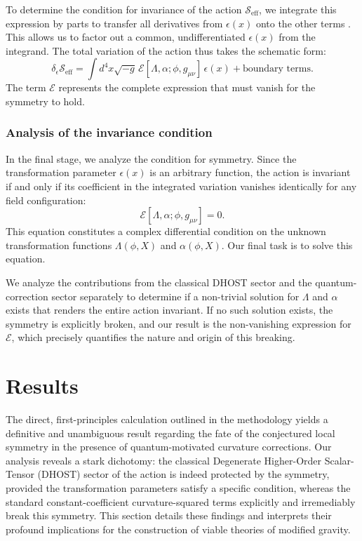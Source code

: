 \documentclass[twocolumn]{aastex631}
\begin{document}
To determine the condition for invariance of the action $\mathcal{S}_{\text{eff}}$, we integrate this expression by parts to transfer all derivatives from $\epsilon(x)$ onto the other terms \citep{gieres2022improvementconservedcurrentdensity,peng2025extractingexpressionfieldequations}. This allows us to factor out a common, undifferentiated $\epsilon(x)$ from the integrand. The total variation of the action thus takes the schematic form:
\begin{equation}
\delta_\epsilon \mathcal{S}_{\text{eff}} = \int d^4x \sqrt{-g} \, \mathcal{E}[\Lambda, \alpha; \phi, g_{\mu\nu}] \, \epsilon(x) + \text{boundary terms}.
\end{equation}
The term $\mathcal{E}$ represents the complete expression that must vanish for the symmetry to hold.
\subsubsection{Analysis of the invariance condition}
In the final stage, we analyze the condition for symmetry. Since the transformation parameter $\epsilon(x)$ is an arbitrary function, the action is invariant if and only if its coefficient in the integrated variation vanishes identically for any field configuration:
\begin{equation}
\mathcal{E}[\Lambda, \alpha; \phi, g_{\mu\nu}] = 0.
\end{equation}
This equation constitutes a complex differential condition on the unknown transformation functions $\Lambda(\phi, X)$ and $\alpha(\phi, X)$. Our final task is to solve this equation.

We analyze the contributions from the classical DHOST sector and the quantum-correction sector separately to determine if a non-trivial solution for $\Lambda$ and $\alpha$ exists that renders the entire action invariant. If no such solution exists, the symmetry is explicitly broken, and our result is the non-vanishing expression for $\mathcal{E}$, which precisely quantifies the nature and origin of this breaking.

\section{Results}
\label{sec:results}
The direct, first-principles calculation outlined in the methodology yields a definitive and unambiguous result regarding the fate of the conjectured local symmetry in the presence of quantum-motivated curvature corrections. Our analysis reveals a stark dichotomy: the classical Degenerate Higher-Order Scalar-Tensor (DHOST) sector of the action is indeed protected by the symmetry, provided the transformation parameters satisfy a specific condition, whereas the standard constant-coefficient curvature-squared terms explicitly and irremediably break this symmetry. This section details these findings and interprets their profound implications for the construction of viable theories of modified gravity.
\end{document}
